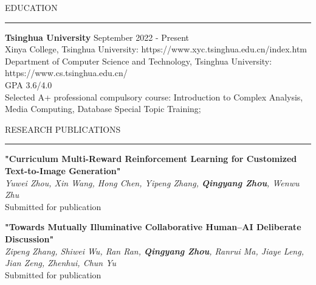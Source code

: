 \documentclass{resume_rhodes} %
\def\sectionskip{\smallskip}
\def\sectionlineskip{\smallskip}
\renewenvironment{rSection}[1]{
\sectionskip
\textcolor{TsinghuaPurple}{\MakeUppercase{#1}}
\sectionlineskip
\hrule
\begin{list}{}{
\setlength{\leftmargin}{0em}
}
\item[]
}{
\end{list}
}
\begin{document}
  


\begin{rSection}{Education}

{\bf Tsinghua University} \hfill
{September 2022 - Present}\\ 
Xinya College, Tsinghua University: https://www.xyc.tsinghua.edu.cn/index.htm
\\
Department of Computer Science and Technology, Tsinghua University: https://www.cs.tsinghua.edu.cn/
\\
GPA 3.6/4.0
\\
Selected A+ professional compulsory course: Introduction to Complex Analysis, Media Computing, Database Special Topic Training; \\

\end{rSection} 


\begin{rSection}{Research Publications} \itemsep -3pt

\textbf{"Curriculum Multi-Reward Reinforcement Learning for Customized Text-to-Image Generation"}\\
\textit{Yuwei Zhou, Xin Wang, Hong Chen, Yipeng Zhang, \textbf{Qingyang Zhou}, Wenwu Zhu}\\
Submitted for publication

\textbf{"Towards Mutually Illuminative Collaborative Human--AI Deliberate Discussion"}\\
\textit{Zipeng Zhang, Shiwei Wu, Ran Ran, \textbf{Qingyang Zhou}, Ranrui Ma, Jiaye Leng, Jian Zeng, Zhenhui, Chun Yu}\\
Submitted for publication

\end{rSection}

\end{document}
